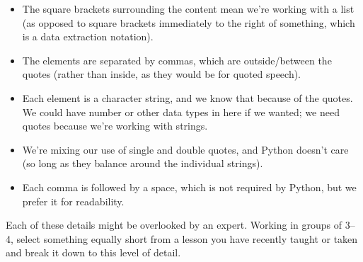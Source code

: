 \begin{itemize}

\item
  The square brackets surrounding the content mean we're working with
  a list (as opposed to square brackets immediately to the right of
  something, which is a data extraction notation).

\item
  The elements are separated by commas, which are outside/between the
  quotes (rather than inside, as they would be for quoted speech).

\item
  Each element is a character string, and we know that because of the
  quotes. We could have number or other data types in here if we
  wanted; we need quotes because we're working with strings.

\item
  We're mixing our use of single and double quotes, and Python doesn't
  care (so long as they balance around the individual strings).

\item
  Each comma is followed by a space, which is not required by Python,
  but we prefer it for readability.

\end{itemize}

Each of these details might be overlooked by an expert.  Working in
groups of 3--4, select something equally short from a lesson you have
recently taught or taken and break it down to this level of detail.
